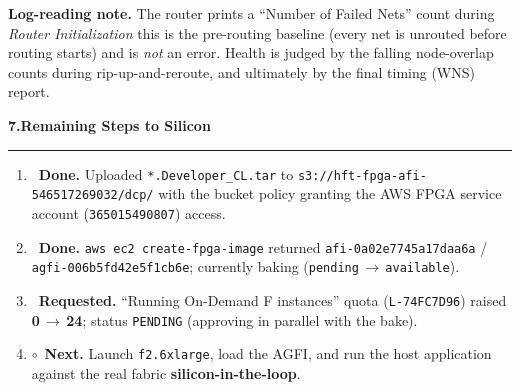\documentclass[10pt,a4paper]{article}
\newcommand{\sectionrule}{\par\nobreak\vspace{1pt}\textcolor{rulegray}{\rule{\linewidth}{0.8pt}}\par\vspace{1pt}}
\newcommand{\fpath}[1]{\texttt{\textcolor{hdrblue}{#1}}}
\newcommand{\cmd}[1]{\texttt{\textcolor{accentteal}{#1}}}
\newcommand{\ok}{\textcolor{okgreen}{\textbf{\checkmark}}}
\newcommand{\pending}{\textcolor{warnamber}{\textbf{$\circ$}}}
\newcommand{\sechead}[2]{{\large\bfseries\color{hdrblue} #1\quad #2}\sectionrule}
\begin{document}
\begin{warnbox}
\textbf{Log-reading note.} The router prints a ``Number of Failed Nets'' count
during \emph{Router Initialization} \textendash{} this is the pre-routing baseline
(every net is unrouted before routing starts) and is \emph{not} an error. Health
is judged by the falling node-overlap counts during rip-up-and-reroute, and
ultimately by the final timing (WNS) report.
\end{warnbox}

\sechead{7.}{Remaining Steps to Silicon}

\begin{center}
\end{center}

\begin{enumerate}[leftmargin=2em,itemsep=1pt]
  \item \ok\ \textbf{Done.} Uploaded \fpath{*.Developer\_CL.tar} to
        \fpath{s3://hft-fpga-afi-546517269032/dcp/} with the bucket policy
        granting the AWS FPGA service account (\fpath{365015490807}) access.
  \item \ok\ \textbf{Done.} \cmd{aws ec2 create-fpga-image} returned
        \fpath{afi-0a02e7745a17daa6a} / \fpath{agfi-006b5fd42e5f1cb6e};
        currently baking (\fpath{pending}\,$\rightarrow$\,\fpath{available}).
  \item \ok\ \textbf{Requested.} ``Running On-Demand F instances'' quota
        (\fpath{L-74FC7D96}) raised \textbf{0}\,$\rightarrow$\,\textbf{24};
        status \fpath{PENDING} (approving in parallel with the bake).
  \item \pending\ \textbf{Next.} Launch \fpath{f2.6xlarge}, load the AGFI, and run
        the host application against the real fabric \textendash{}
        \textbf{silicon-in-the-loop}.
\end{enumerate}
\end{document}
